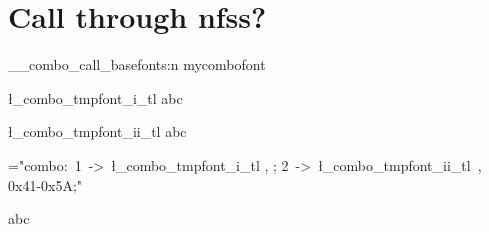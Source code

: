 \documentclass[parskip=half-]{scrartcl}
\begin{document}
\section{Call through nfss?}

\ExplSyntaxOn
\__combo_call_basefonts:n {mycombofont}

\l_combo_tmpfont_i_tl abc 

\l_combo_tmpfont_ii_tl abc

 \font\testfont ="combo:~1~->~\fontid\l_combo_tmpfont_i_tl , ; 2~->~\fontid \l_combo_tmpfont_ii_tl~,~ 0x41-0x5A;"
 
 \testfont abc
 

\ExplSyntaxOff

%
\end{document}
